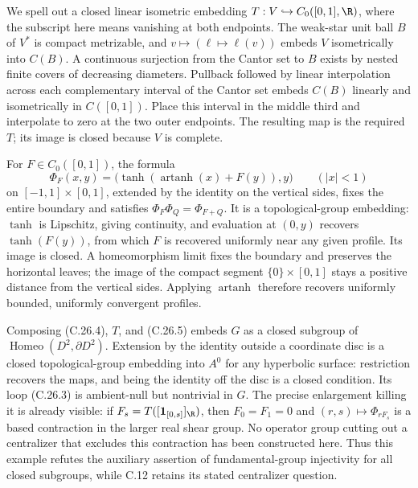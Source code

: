 We spell out a closed linear isometric embedding
$T:V\hookrightarrow C_0([0,1],\R)$, where the subscript here means
vanishing at both endpoints. The weak-star unit ball $B$ of $V^*$ is
compact metrizable, and $v\mapsto(\ell\mapsto\ell(v))$ embeds $V$
isometrically into $C(B)$. A continuous surjection from the Cantor
set to $B$ exists by nested finite covers of decreasing diameters.
Pullback followed by linear interpolation across each complementary
interval of the Cantor set embeds $C(B)$ linearly and isometrically
in $C([0,1])$. Place this interval in the middle third and interpolate
to zero at the two outer endpoints. The resulting map is the required
$T$; its image is closed because $V$ is complete.

For $F\in C_0([0,1])$, the formula
\[
 \Phi_F(x,y)=
   \bigl(\tanh(\operatorname{artanh}(x)+F(y)),y\bigr)
          \qquad(|x|<1)
                                                        \tag{C.26.5}
\]
on $[-1,1]\times[0,1]$, extended by the identity on the vertical
sides, fixes the entire boundary and satisfies
$\Phi_F\Phi_Q=\Phi_{F+Q}$. It is a topological-group embedding:
$\tanh$ is Lipschitz, giving continuity, and evaluation at $(0,y)$
recovers $\tanh(F(y))$, from which $F$ is recovered uniformly near
any given profile. Its image is closed. A homeomorphism limit fixes
the boundary and preserves the horizontal leaves; the image of the
compact segment $\{0\}\times[0,1]$ stays a positive distance from the
vertical sides. Applying $\operatorname{artanh}$ therefore recovers
uniformly bounded, uniformly convergent profiles.

Composing (C.26.4), $T$, and (C.26.5) embeds $G$ as a closed subgroup
of $\operatorname{Homeo}(D^2,\partial D^2)$. Extension by the identity
outside a coordinate disc is a closed topological-group embedding
into $A^0$ for any hyperbolic surface: restriction recovers the maps,
and being the identity off the disc is a closed condition. Its loop
(C.26.3) is ambient-null but nontrivial in $G$.
The precise enlargement killing it is already visible: if
$F_s=T([\mathbf1_{[0,s]}]_{\R})$, then $F_0=F_1=0$ and
$(r,s)\mapsto\Phi_{rF_s}$ is a based contraction in the larger real
shear group. No operator group cutting out a centralizer that excludes
this contraction has been constructed here. Thus this example refutes
the auxiliary assertion of fundamental-group injectivity for all
closed subgroups, while C.12 retains its stated centralizer question.
